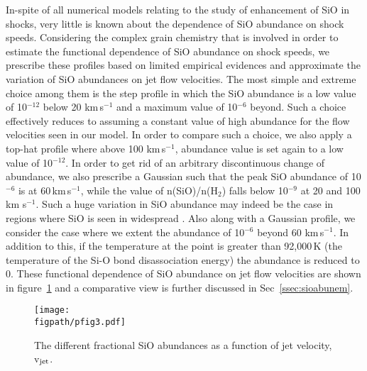\documentclass[useAMS,usenatbib]{mn2e}
\newcommand{\figpath}{/home/phybva/SiOJets_New/PAPER/NEWFIGS}
\begin{document}
In-spite of all numerical models relating to the study of enhancement
of SiO in shocks, very little is known about the dependence of SiO
abundance on shock speeds. Considering the complex grain
chemistry that is involved in order to estimate the functional
dependence of SiO abundance on shock speeds, we prescribe these
profiles based on limited empirical evidences 
and approximate the variation of SiO abundances on jet flow velocities.   
The most simple and extreme choice among
them is the step profile in which the SiO abundance is a low value of
10$^{-12}$ below 20 km\,s$^{-1}$ and a maximum value of 10$^{-6}$ beyond. 
Such a choice effectively reduces to assuming a constant value of high abundance for the 
flow velocities seen in our model. In order to compare such a choice, 
we also apply a top-hat profile where above 100 km\,s$^{-1}$, abundance value 
is set again to a low value of 10$^{-12}$.
In order to get rid of an arbitrary discontinuous change of abundance, we also
prescribe a Gaussian such that the peak SiO abundance of 10$^{-6}$ is at
60\,km\,s$^{-1}$, while the value of n(SiO)/n(H$_{2}$) falls below
10$^{-9}$ at 20 and 100 km s$^{-1}$. Such a huge variation in SiO
abundance may indeed be the case in regions where SiO is seen
in widespread \citep[e.g.,][also see section~\ref{sec:discussion}]
{Lefloch:1998p13983}. Also along with a Gaussian profile, we consider
the case where we extent the abundance of 10$^{-6}$ beyond 60 km\,s$^{-1}$.   
In addition to this, if the temperature at the point is greater than
92,000\,K (the temperature of the Si-O bond disassociation energy) 
the abundance is reduced to 0. 
These functional dependence of SiO abundance on jet flow velocities are shown in figure~\ref{abun} 
and a comparative view is further discussed in Sec~\ref{ssec:sioabunem}.
%

 \begin{figure}
  \texttt{[image: \\figpath/pfig3.pdf]}%
  \caption{The different fractional SiO abundances as a function of
    jet velocity, v$_{\rm jet}$.}
  \label{abun}
 \end{figure}

\end{document}
